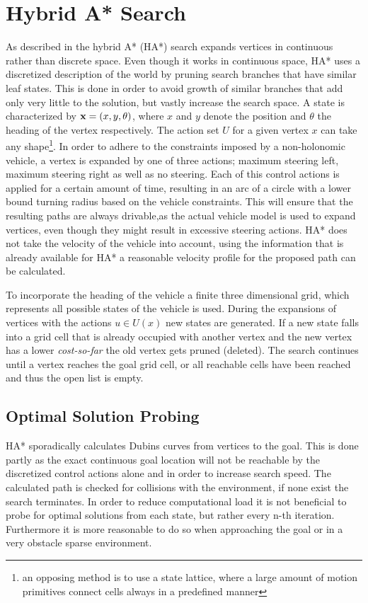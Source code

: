 \section{Hybrid A* Search}
As described in  the hybrid A* (HA*) search expands vertices in continuous rather than discrete space. Even though it works in continuous space, HA* uses a discretized description of the world by pruning search branches that have similar leaf states. This is done in order to avoid growth of similar branches that add only very little to the solution, but vastly increase the search space. A state is characterized by $\mathbf{x} = (x, y, \theta)$, where $x$ and $y$ denote the position and $\theta$ the heading of the vertex respectively. The action set $U$ for a given vertex $x$ can take any shape\footnote{an opposing method is to use a state lattice, where a large amount of motion primitives connect cells always in a predefined manner}. In order to adhere to the constraints imposed by a non-holonomic vehicle, a vertex is expanded by one of three actions; maximum steering left, maximum steering right as well as no steering. Each of this control actions is applied for a certain amount of time, resulting in an arc of a circle with a lower bound turning radius based on the vehicle constraints. This will ensure that the resulting paths are always drivable,as the actual vehicle model is used to expand vertices, even though they might result in excessive steering actions. HA* does not take the velocity of the vehicle into account, using the information that is already available for HA* a reasonable velocity profile for the proposed path can be calculated.

To incorporate the heading of the vehicle a finite three dimensional grid, which represents all possible states of the vehicle is used. During the expansions of vertices with the actions $u \in U(x)$ new states are generated. If a new state falls into a grid cell that is already occupied with another vertex and the new vertex has a lower \textit{cost-so-far} the old vertex gets pruned (deleted). The search continues until a vertex reaches the goal grid cell, or all reachable cells have been reached and thus the open list is empty.

\subsection{Optimal Solution Probing}
HA* sporadically calculates Dubins curves from vertices to the goal. This is done partly as the exact continuous goal location will not be reachable by the discretized control actions alone and in order to increase search speed. The calculated path is checked for collisions with the environment, if none exist the search terminates. In order to reduce computational load it is not beneficial to probe for optimal solutions from each state, but rather every n-th iteration. Furthermore it is more reasonable to do so when approaching the goal or in a very obstacle sparse environment.

